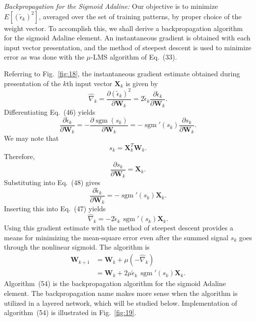 \documentclass[10pt,twocolumn]{article}
\newcommand{\X}{\bm{X}}
\newcommand{\W}{\bm{W}}
\newcommand{\sgm}{\operatorname{sgm}}
\begin{document}
\textit{Backpropagation for the Sigmoid Adaline:} Our objective is to minimize
$E[(\tilde{\epsilon}_k)^2]$, averaged over the set of training patterns, by proper
choice of the weight vector. To accomplish this, we shall derive a backpropagation
algorithm for the sigmoid Adaline element. An instantaneous gradient is obtained
with each input vector presentation, and the method of steepest descent is used to
minimize error as was done with the $\mu$-LMS algorithm of Eq.~(33).

Referring to Fig.~\ref{fig:18}, the instantaneous gradient estimate obtained during
presentation of the $k$th input vector $\X_k$ is given by
\begin{equation}
\hat{\nabla}_k = \frac{\partial(\tilde{\epsilon}_k)^2}{\partial\W_k}
= 2\tilde{\epsilon}_k\frac{\partial\tilde{\epsilon}_k}{\partial\W_k}. \tag{47}
\end{equation}
Differentiating Eq.~(46) yields
\begin{equation}
\frac{\partial\tilde{\epsilon}_k}{\partial\W_k} = -\frac{\partial\sgm(s_k)}{\partial\W_k}
= -\sgm'(s_k)\frac{\partial s_k}{\partial\W_k}. \tag{48}
\end{equation}
We may note that
\begin{equation}
s_k = \X_k^{T}\W_k. \tag{49}
\end{equation}
Therefore,
\begin{equation}
\frac{\partial s_k}{\partial\W_k} = \X_k. \tag{50}
\end{equation}
Substituting into Eq.~(48) gives
\begin{equation}
\frac{\partial\tilde{\epsilon}_k}{\partial\W_k} = -\sgm'(s_k)\X_k. \tag{51}
\end{equation}
Inserting this into Eq.~(47) yields
\begin{equation}
\hat{\nabla}_k = -2\tilde{\epsilon}_k\,\sgm'(s_k)\X_k. \tag{52}
\end{equation}
Using this gradient estimate with the method of steepest descent provides a means
for minimizing the mean-square error even after the summed signal $s_k$ goes
through the nonlinear sigmoid. The algorithm is
\begin{align}
\W_{k+1} &= \W_k + \mu(-\hat{\nabla}_k) \tag{53}\\
&= \W_k + 2\mu\tilde{\epsilon}_k\,\sgm'(s_k)\X_k. \tag{54}
\end{align}
Algorithm~(54) is the backpropagation algorithm for the sigmoid Adaline element.
The backpropagation name makes more sense when the algorithm is utilized in a
layered network, which will be studied below. Implementation of algorithm~(54) is
illustrated in Fig.~\ref{fig:19}.
\end{document}
